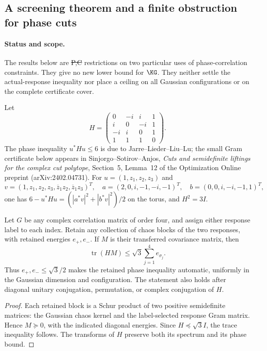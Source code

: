 \subsection{A screening theorem and a finite obstruction for phase cuts}
\label{sec:phase-lift-screening-20261022}

\paragraph{Status and scope.}
The results below are \st{P,C} restrictions on two particular uses of
phase-correlation constraints. They give no new lower bound for $\KG$.
They neither settle the actual-response inequality nor place a ceiling
on all Gaussian configurations or on the complete certificate cover.

Let
\[
 H=\begin{pmatrix}0&-i&i&1\\i&0&-i&1\\-i&i&0&1\\1&1&1&0\end{pmatrix}.
\]
The phase inequality $u^*Hu\le6$ is due to Jarre--Lieder--Liu--Lu;
the small Gram certificate below appears in Sinjorgo--Sotirov--Anjos,
\emph{Cuts and semidefinite liftings for the complex cut polytope},
Section~5, Lemma~12 of the Optimization Online preprint
(arXiv:2402.04731).
For $u=(1,z_1,z_2,z_3)$ and
\[
 v=(1,z_1,z_2,z_3,\overline z_1z_2,\overline z_1z_3)^T,
 \quad a=(2,0,i,-1,-i,-1)^T,\quad b=(0,0,i,-i,-1,1)^T,
\]
one has $6-u^*Hu=(|a^*v|^2+|b^*v|^2)/2$ on the torus, and $H^2=3I$.

\begin{proposition}
Let $G$ be any complex correlation matrix of order four, and assign
either response label to each index. Retain any collection of chaos
blocks of the two responses, with retained energies $e_+,e_-$.
If $M$ is their transferred covariance matrix, then
\[
 \operatorname{tr}(HM)\le\sqrt3\sum_{j=1}^4e_{\sigma_j}.
\]
Thus $e_+,e_-\le\sqrt3/2$ makes the retained phase inequality automatic,
uniformly in the Gaussian dimension and configuration. The statement
also holds after diagonal unitary conjugation, permutation, or complex
conjugation of $H$.
\end{proposition}
\begin{proof}
Each retained block is a Schur product of two positive semidefinite
matrices: the Gaussian chaos kernel and the label-selected response
Gram matrix. Hence $M\succeq0$, with the indicated diagonal energies.
Since $H\preceq\sqrt3I$, the trace inequality follows. The transforms
of $H$ preserve both its spectrum and its phase bound.
\end{proof}

